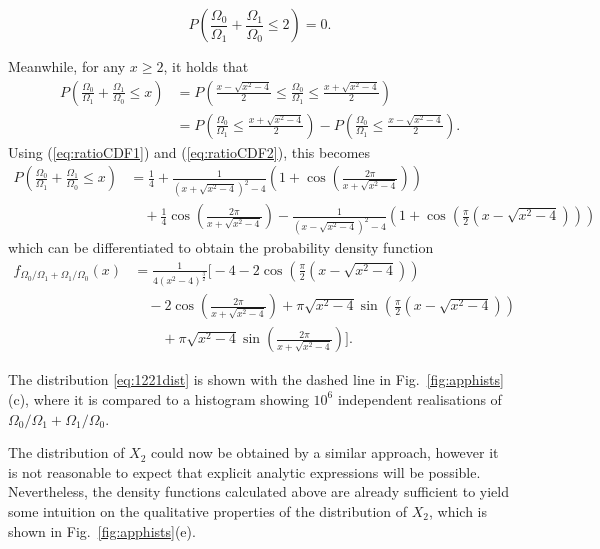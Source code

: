 \documentclass[nofootinbib,prb,amsmath,amssymb,twocolumn,floatfix]{revtex4-2}
\theoremstyle{definition}
\begin{document}
\begin{equation}
	P\left(\frac{\Omega_0}{\Omega_1}+\frac{\Omega_1}{\Omega_0}\leq 2\right)=0.
\end{equation}
%
%
\begin{widetext}
Meanwhile, for any $x\geq2$, it holds that
\begin{align}
	P\left(\frac{\Omega_0}{\Omega_1}+\frac{\Omega_1}{\Omega_0}\leq x\right)
	&=P\left(\frac{x-\sqrt{x^2-4}}{2}\leq\frac{\Omega_0}{\Omega_1}\leq \frac{x+\sqrt{x^2-4}}{2}\right) \nonumber \\
	&=P\left(\frac{\Omega_0}{\Omega_1}\leq \frac{x+\sqrt{x^2-4}}{2}\right) - P\left(\frac{\Omega_0}{\Omega_1}\leq\frac{x-\sqrt{x^2-4}}{2}\right).
\end{align}
Using (\ref{eq:ratioCDF1}) and (\ref{eq:ratioCDF2}), this becomes
\begin{equation}
	\begin{split}
		P\left(\frac{\Omega_0}{\Omega_1}+\frac{\Omega_1}{\Omega_0}\leq x\right) &= \frac{1}{4} + \frac{1}{(x+\sqrt{x^2-4})^2-4}\left(1+ \cos\left( \frac{2\pi}{x+\sqrt{x^2-4}} \right)\right)
		\\ &\quad +\frac{1}{4}\cos\left( \frac{2\pi}{x+\sqrt{x^2-4}} \right) - \frac{1}{(x-\sqrt{x^2-4})^2-4}\left(1+ \cos\left( \frac{\pi}{2}(x-\sqrt{x^2-4}) \right)\right)
	\end{split}
\end{equation}
which can be differentiated to obtain the probability density function
\begin{equation} \label{eq:1221dist}
	\begin{split}
		f_{\Omega_0/\Omega_1+\Omega_1/\Omega_0}(x)&=\frac{1}{4(x^2-4)^\frac{3}{2}} \bigg[ -4-2\cos\left( \frac{\pi}{2}(x-\sqrt{x^2-4})\right) \\
		&\quad -2\cos\left( \frac{2\pi}{x+\sqrt{x^2-4}}\right) +\pi \sqrt{x^2-4}\sin \left( \frac{\pi}{2}(x-\sqrt{x^2-4})\right) \\
		&\qquad +\pi \sqrt{x^2-4}\sin \left(  \frac{2\pi}{x+\sqrt{x^2-4}} \right) 
		\bigg].
	\end{split}
\end{equation}
\end{widetext}
%
%
The distribution \eqref{eq:1221dist} is shown with the dashed line in Fig.~\ref{fig:apphists}(c), where it is compared to a histogram showing $10^6$ independent realisations of $\Omega_0/\Omega_1+\Omega_1/\Omega_0$. 

The distribution of $X_2$ could now be obtained by a similar approach, however it is not reasonable to expect that explicit analytic expressions will be possible. Nevertheless, the density functions calculated above are already sufficient to yield some intuition on the qualitative properties of the distribution of $X_2$, which is shown in Fig.~\ref{fig:apphists}(e).
\end{document}
